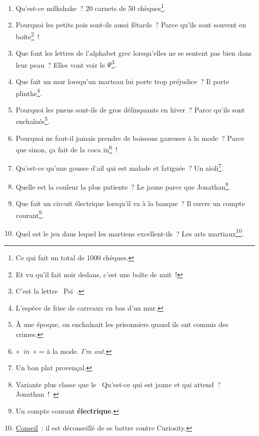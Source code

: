 \documentclass[10pt,a5paper,fullpage]{book}
\begin{document}
\begin{enumerate}
		\item Qu’est-ce milkshake~? 20 carnets de 50 chèques\footnote{Ce qui fait un total de 1000 chèques.}.
		\item Pourquoi les petits pois sont-ils aussi fêtards~? Parce qu'ils sont souvent en boîte\footnote{Et vu qu’il fait noir dedans, c’est une boîte de nuit~!}~!
		\item Que font les lettres de l’alphabet grec lorsqu’elles ne se sentent pas bien dans leur peau~? Elles vont voir le $\Psi$\footnote{C'est la lettre \guillemotleft~Psi~\guillemotright.}.
		\item Que fait un mur lorsqu’un marteau lui porte trop préjudice~? Il porte plinthe\footnote{L’espèce de frise de carreaux en bas d’un mur. }.
		\item Pourquoi les pneus sont-ils de gros délinquants en hiver~? Parce qu’ils sont enchaînés\footnote{À une époque, on enchaînait les prisonniers quand ils ont commis des crimes.}. 
		\item Pourquoi ne faut-il jamais prendre de boissons gazeuses à la mode~? Parce que sinon, ça fait de la coca in\footnote{« \textit{in} » = à la mode. \textit{I'm out.}}~!
		\item Qu’est-ce qu’une gousse d’ail qui est malade et fatiguée~? Un aïoli\footnote{Un bon plat provençal.}.
		\item Quelle est la couleur la plus patiente~? Le jaune parce que Jonathan\footnote{Variante plus classe que le \guillemotleft~Qu'est-ce qui est jaune et qui attend~? Jonathan~!~\guillemotright}.
		\item Que fait un circuit électrique lorsqu’il va à la banque~? Il ouvre un compte courant\footnote{Un compte courant \textbf{électrique}.}.
		\item Quel est le jeu dans lequel les martiens excellent-ils~? Les arts martiaux\footnote{\underline{Conseil}~: il est déconseillé de se battre contre Curiosity.}.

\end{enumerate}
\end{document}
